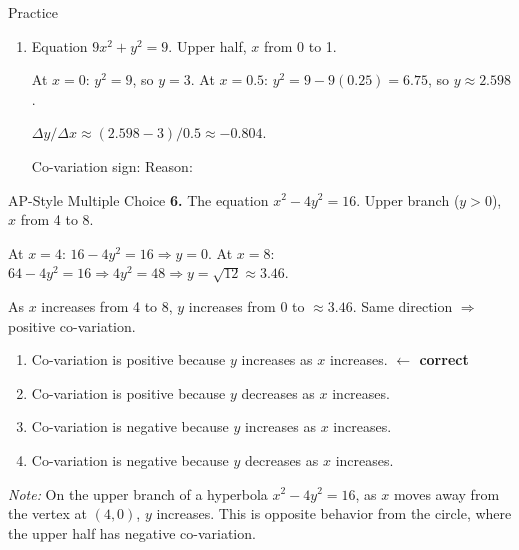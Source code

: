 \documentclass[10pt]{article}
\begin{document}
\begin{notesbox}{Practice}
\begin{enumerate}[leftmargin=1.5em, itemsep=10pt]
\begin{enumerate}[leftmargin=1.2em, itemsep=6pt]
    \item[(b)] 

    \item[(c)] Co-variation: 
\end{enumerate}

\item Equation $9x^2 + y^2 = 9$. Upper half, $x$ from 0 to 1.

At $x = 0$: $y^2 = 9$, so $y = 3$. \quad At $x = 0.5$: $y^2 = 9 - 9(0.25) = 6.75$, so $y \approx 2.598$.

$\Delta y/\Delta x \approx (2.598 - 3)/0.5 \approx -0.804$.

Co-variation sign:  \quad Reason: 

\end{enumerate}
\end{notesbox}

\vspace{0.08in}

\begin{notesbox}{AP-Style Multiple Choice}
\textbf{6.} The equation $x^2 - 4y^2 = 16$. Upper branch ($y > 0$), $x$ from 4 to 8.

At $x = 4$: $16 - 4y^2 = 16 \Rightarrow y = 0$. At $x = 8$: $64 - 4y^2 = 16 \Rightarrow 4y^2 = 48 \Rightarrow y = \sqrt{12} \approx 3.46$.

As $x$ increases from 4 to 8, $y$ increases from 0 to $\approx 3.46$. Same direction $\Rightarrow$ positive co-variation.

\vspace{4pt}
\begin{enumerate}[label=(\Alph*), leftmargin=2em, itemsep=4pt]
    \item Co-variation is positive because $y$ increases as $x$ increases. \textcolor{keyred}{\textbf{$\leftarrow$ correct}}
    \item Co-variation is positive because $y$ decreases as $x$ increases.
    \item Co-variation is negative because $y$ increases as $x$ increases.
    \item Co-variation is negative because $y$ decreases as $x$ increases.
\end{enumerate}

\vspace{4pt}
\textit{Note:} On the upper branch of a hyperbola $x^2 - 4y^2 = 16$, as $x$ moves away from
the vertex at $(4, 0)$, $y$ increases. This is opposite behavior from the circle, where the
upper half has negative co-variation.
\end{notesbox}
\end{document}
